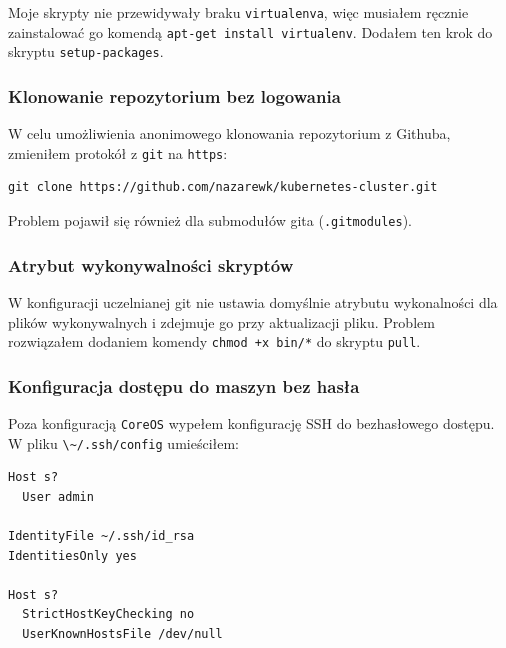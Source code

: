 \documentclass[a4paper,12pt,twoside,openany]{report}
\newcommand{\passthrough}[1]{#1}
\begin{document}
Moje skrypty nie przewidywały braku
\passthrough{\lstinline!virtualenva!}, więc musiałem ręcznie
zainstalować go komendą
\passthrough{\lstinline!apt-get install virtualenv!}. Dodałem ten krok
do skryptu \passthrough{\lstinline!setup-packages!}.

\hypertarget{klonowanie-repozytorium-bez-logowania}{%
\subsubsection{Klonowanie repozytorium bez
logowania}\label{klonowanie-repozytorium-bez-logowania}}

W celu umożliwienia anonimowego klonowania repozytorium z Githuba,
zmieniłem protokół z \passthrough{\lstinline!git!} na
\passthrough{\lstinline!https!}:

\begin{lstlisting}
git clone https://github.com/nazarewk/kubernetes-cluster.git
\end{lstlisting}

Problem pojawił się również dla submodułów gita
(\passthrough{\lstinline!.gitmodules!}).

\hypertarget{atrybut-wykonywalnoux15bci-skryptuxf3w}{%
\subsubsection{Atrybut wykonywalności
skryptów}\label{atrybut-wykonywalnoux15bci-skryptuxf3w}}

W konfiguracji uczelnianej git nie ustawia domyślnie atrybutu
wykonalności dla plików wykonywalnych i zdejmuje go przy aktualizacji
pliku. Problem rozwiązałem dodaniem komendy
\passthrough{\lstinline!chmod +x bin/*!} do skryptu
\passthrough{\lstinline!pull!}.

\hypertarget{konfiguracja-dostux119pu-do-maszyn-bez-hasux142a}{%
\subsubsection{Konfiguracja dostępu do maszyn bez
hasła}\label{konfiguracja-dostux119pu-do-maszyn-bez-hasux142a}}

Poza konfiguracją \passthrough{\lstinline!CoreOS!} wypełem konfigurację
SSH do bezhasłowego dostępu. W pliku
\passthrough{\lstinline!\~/.ssh/config!} umieściłem:

\begin{lstlisting}
Host s?
  User admin
  
IdentityFile ~/.ssh/id_rsa
IdentitiesOnly yes

Host s?
  StrictHostKeyChecking no
  UserKnownHostsFile /dev/null
\end{lstlisting}
\end{document}
